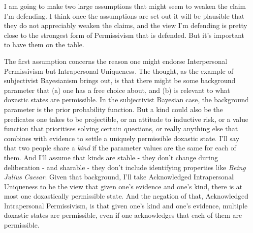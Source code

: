 \documentclass[
  11pt,
]{article}
\begin{document}
I am going to make two large assumptions that might seem to weaken the claim I'm defending. I think once the assumptions are set out it will be plausible that they do not appreciably weaken the claims, and the view I'm defending is pretty close to the strongest form of Permissivism that is defended. But it's important to have them on the table.

The first assumption concerns the reason one might endorse Interpersonal Permissivism but Intrapersonal Uniqueness. The thought, as the example of subjectivist Bayesianism brings out, is that there might be some background parameter that (a) one has a free choice about, and (b) is relevant to what doxastic states are permissible. In the subjectivist Bayesian case, the background parameter is the prior probability function. But a kind could also be the predicates one takes to be projectible, or an attitude to inductive risk, or a value function that prioritises solving certain questions, or really anything else that combines with evidence to settle a uniquely permissible doxastic state. I'll say that two people share a \emph{kind} if the parameter values are the same for each of them. And I'll assume that kinds are stable - they don't change during deliberation - and sharable - they don't include identifying properties like \emph{Being Julius Caesar}. Given that background, I'll take Acknowledged Intrapersonal Uniqueness to be the view that given one's evidence and one's kind, there is at most one doxastically permissible state. And the negation of that, Acknowledged Intrapersonal Permissivism, is that given one's kind and one's evidence, multiple doxastic states are permissible, even if one acknowledges that each of them are permissible.
\end{document}
